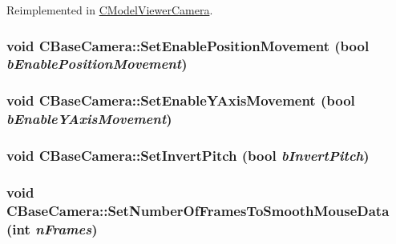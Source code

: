 Reimplemented in \hyperlink{class_c_model_viewer_camera_aecba47f0c48401639138f602d3ed28bd}{CModelViewerCamera}.\hypertarget{class_c_base_camera_a6f65efa814bda8435fb45cca7f9c1f32}{
\subsubsection[{SetEnablePositionMovement}]{\setlength{\rightskip}{0pt plus 5cm}void CBaseCamera::SetEnablePositionMovement (bool {\em bEnablePositionMovement})}}
\label{class_c_base_camera_a6f65efa814bda8435fb45cca7f9c1f32}
\hypertarget{class_c_base_camera_a5eb76cd5ca8ee2b377cf7434ee718547}{
\subsubsection[{SetEnableYAxisMovement}]{\setlength{\rightskip}{0pt plus 5cm}void CBaseCamera::SetEnableYAxisMovement (bool {\em bEnableYAxisMovement})}}
\label{class_c_base_camera_a5eb76cd5ca8ee2b377cf7434ee718547}
\hypertarget{class_c_base_camera_ad76b241a4bf9ef386563fd1a38ef70ae}{
\subsubsection[{SetInvertPitch}]{\setlength{\rightskip}{0pt plus 5cm}void CBaseCamera::SetInvertPitch (bool {\em bInvertPitch})}}
\label{class_c_base_camera_ad76b241a4bf9ef386563fd1a38ef70ae}
\hypertarget{class_c_base_camera_a7cda8d85d13b016697b4c4e27d57e41c}{
\subsubsection[{SetNumberOfFramesToSmoothMouseData}]{\setlength{\rightskip}{0pt plus 5cm}void CBaseCamera::SetNumberOfFramesToSmoothMouseData ({\bf int} {\em nFrames})}}
